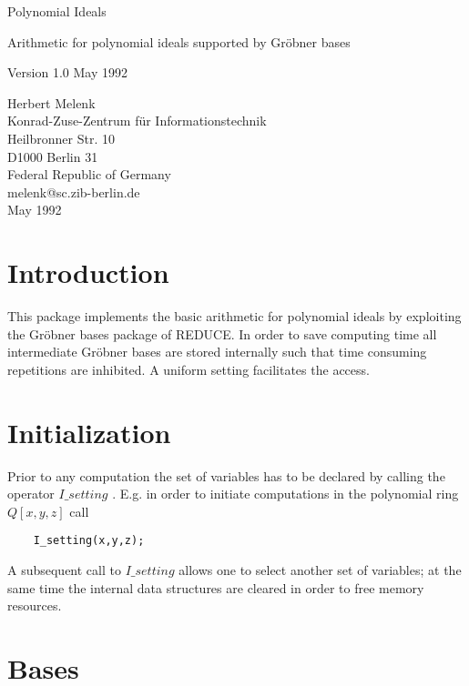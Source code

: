 
\begin{center} {\Large Polynomial Ideals} \end{center}
\begin{center} Arithmetic for polynomial ideals supported by
Gr\"obner bases \end{center}
\begin{center} Version 1.0 May 1992 \end{center}

\begin{center} Herbert Melenk \\ Konrad-Zuse-Zentrum f\"ur
Informationstechnik \\
Heilbronner Str. 10 \\ D1000 Berlin 31 \\ Federal Republic of Germany \\
melenk@sc.zib-berlin.de \\ May 1992 \end{center}

\section{Introduction}

This package implements the basic arithmetic for polynomial ideals
by exploiting the Gr\"obner bases package of REDUCE.
In order to save computing time all intermediate Gr\"obner bases
are stored internally such that time consuming repetitions
are inhibited. A uniform setting facilitates the access.

\section{Initialization}

Prior to any computation the set of variables has to be declared
by calling the operator $I\_setting$ . E.g. in order to initiate
computations in the polynomial ring $Q[x,y,z]$ call
\begin{verbatim}
    I_setting(x,y,z);
\end{verbatim}
A subsequent call to $I\_setting$ allows one to select another set
of variables; at the same time the internal data structures
are cleared in order to free memory resources.

\section{Bases}

